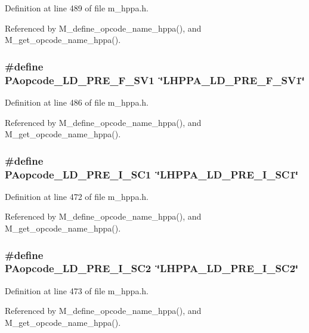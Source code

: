 Definition at line 489 of file m\_\-hppa.h.

Referenced by M\_\-define\_\-opcode\_\-name\_\-hppa(), and M\_\-get\_\-opcode\_\-name\_\-hppa().
\subsubsection{\setlength{\rightskip}{0pt plus 5cm}\#define PAopcode\_\-LD\_\-PRE\_\-F\_\-SV1~\char`\"{}LHPPA\_\-LD\_\-PRE\_\-F\_\-SV1\char`\"{}}\label{m__hppa_8h_334b0b0bf4e1e00068cb3c1e15313a3b}




Definition at line 486 of file m\_\-hppa.h.

Referenced by M\_\-define\_\-opcode\_\-name\_\-hppa(), and M\_\-get\_\-opcode\_\-name\_\-hppa().
\subsubsection{\setlength{\rightskip}{0pt plus 5cm}\#define PAopcode\_\-LD\_\-PRE\_\-I\_\-SC1~\char`\"{}LHPPA\_\-LD\_\-PRE\_\-I\_\-SC1\char`\"{}}\label{m__hppa_8h_7ffc677cfc68daafa5b38a1719018662}




Definition at line 472 of file m\_\-hppa.h.

Referenced by M\_\-define\_\-opcode\_\-name\_\-hppa(), and M\_\-get\_\-opcode\_\-name\_\-hppa().
\subsubsection{\setlength{\rightskip}{0pt plus 5cm}\#define PAopcode\_\-LD\_\-PRE\_\-I\_\-SC2~\char`\"{}LHPPA\_\-LD\_\-PRE\_\-I\_\-SC2\char`\"{}}\label{m__hppa_8h_0ac70cb99380bf6efa8dae14301b9847}




Definition at line 473 of file m\_\-hppa.h.

Referenced by M\_\-define\_\-opcode\_\-name\_\-hppa(), and M\_\-get\_\-opcode\_\-name\_\-hppa().
